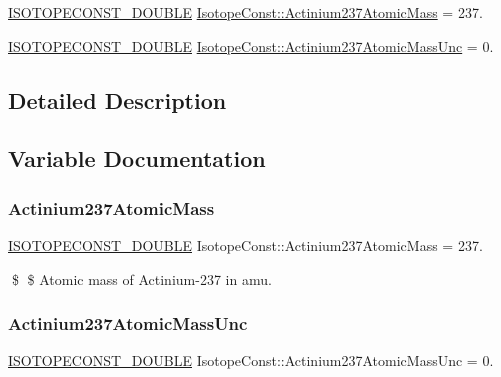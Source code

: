 \begin{DoxyCompactItemize}
\item 
\mbox{\hyperlink{group___isotope_const-_macros_ga8f45a7272ce02c0b4c65c44636ed719a}{I\+S\+O\+T\+O\+P\+E\+C\+O\+N\+S\+T\+\_\+\+D\+O\+U\+B\+LE}} \mbox{\hyperlink{group___isotope_const-_actinium-_ac237_ga199304e6c2fbe598cf20396906292219}{Isotope\+Const\+::\+Actinium237\+Atomic\+Mass}} = 237.
\item 
\mbox{\hyperlink{group___isotope_const-_macros_ga8f45a7272ce02c0b4c65c44636ed719a}{I\+S\+O\+T\+O\+P\+E\+C\+O\+N\+S\+T\+\_\+\+D\+O\+U\+B\+LE}} \mbox{\hyperlink{group___isotope_const-_actinium-_ac237_ga732decb876fed0396a858774ee1a6b33}{Isotope\+Const\+::\+Actinium237\+Atomic\+Mass\+Unc}} = 0.
\end{DoxyCompactItemize}


\subsection{Detailed Description}


\subsection{Variable Documentation}
\mbox{\label{group___isotope_const-_actinium-_ac237_ga199304e6c2fbe598cf20396906292219}} 
\subsubsection{\texorpdfstring{Actinium237\+Atomic\+Mass}{Actinium237AtomicMass}}
{\footnotesize\ttfamily \mbox{\hyperlink{group___isotope_const-_macros_ga8f45a7272ce02c0b4c65c44636ed719a}{I\+S\+O\+T\+O\+P\+E\+C\+O\+N\+S\+T\+\_\+\+D\+O\+U\+B\+LE}} Isotope\+Const\+::\+Actinium237\+Atomic\+Mass = 237.}

\$ \$ Atomic mass of Actinium-\/237 in amu. \mbox{\label{group___isotope_const-_actinium-_ac237_ga732decb876fed0396a858774ee1a6b33}} 
\subsubsection{\texorpdfstring{Actinium237\+Atomic\+Mass\+Unc}{Actinium237AtomicMassUnc}}
{\footnotesize\ttfamily \mbox{\hyperlink{group___isotope_const-_macros_ga8f45a7272ce02c0b4c65c44636ed719a}{I\+S\+O\+T\+O\+P\+E\+C\+O\+N\+S\+T\+\_\+\+D\+O\+U\+B\+LE}} Isotope\+Const\+::\+Actinium237\+Atomic\+Mass\+Unc = 0.}

